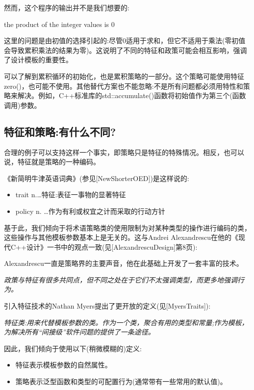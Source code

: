 然而，这个程序的输出并不是我们想要的:

\begin{shell}
the product of the integer values is 0
\end{shell}

这里的问题是由初值的选择引起的:尽管0适用于求和，但它不适用于乘法(零初值会导致累积乘法的结果为零)。这说明了不同的特征和政策可能会相互影响，强调了设计模板的重要性。

可以了解到累积循环的初始化，也是累积策略的一部分。这个策略可能使用特征zero()，也可能不使用。其他替代方案也不能忽略:不是所有问题都必须用特性和策略来解决。例如，C++标准库的std::accumulate()函数将初始值作为第三个(函数调用)参数。

\subsection{特征和策略:有什么不同?}

合理的例子可以支持这样一个事实，即策略只是特征的特殊情况。相反，也可以说，特征就是策略的一种编码。

《新简明牛津英语词典》(参见[NewShorterOED])是这样说的:

\begin{itemize}
\item 
trait n.…特征:表征一事物的显著特征

\item 
policy n. …作为有利或权宜之计而采取的行动方针
\end{itemize}

基于此，我们倾向于将术语策略类的使用限制为对某种类型的操作进行编码的类，这些操作与其他模板参数基本上是无关的。这与Andrei Alexandrescu在他的《现代C++设计》一书中的观点一致(见[AlexandrescuDesign]第8页):

\begin{notice}
Alexandrescu一直是策略界的主要声音，他在此基础上开发了一套丰富的技术。
\end{notice}

\textit{政策与特征有很多共同点，但不同之处在于它们不太强调类型，而更多地强调行为。}

引入特征技术的Nathan Myers提出了更开放的定义(见[MyersTraits]):

\textit{特征类:用来代替模板参数的类。作为一个类，聚合有用的类型和常量;作为模板，为解决所有“间接级”软件问题的提供了一条途径。}

因此，我们倾向于使用以下(稍微模糊的)定义:

\begin{itemize}
\item 
特征表示模板参数的自然属性。

\item 
策略表示泛型函数和类型的可配置行为(通常带有一些常用的默认值)。
\end{itemize}

